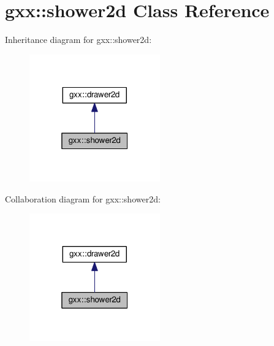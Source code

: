 \hypertarget{classgxx_1_1shower2d}{}\section{gxx\+:\+:shower2d Class Reference}
\label{classgxx_1_1shower2d}


Inheritance diagram for gxx\+:\+:shower2d\+:
\nopagebreak
\begin{figure}[H]
\begin{center}
\leavevmode
\includegraphics[width=160pt]{classgxx_1_1shower2d__inherit__graph}
\end{center}
\end{figure}


Collaboration diagram for gxx\+:\+:shower2d\+:
\nopagebreak
\begin{figure}[H]
\begin{center}
\leavevmode
\includegraphics[width=160pt]{classgxx_1_1shower2d__coll__graph}
\end{center}
\end{figure}
